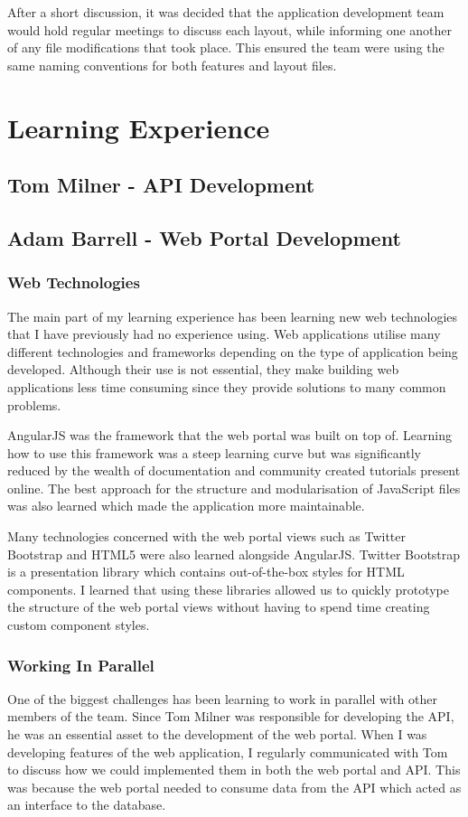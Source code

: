 \documentclass[11pt,a4paper]{report}
\begin{document}
After a short discussion, it was decided that the application development team would hold regular meetings to discuss each layout, while informing one another of any file modifications that took place. This ensured the team were using the same naming conventions for both features and layout files.

\section{Learning Experience}
\label{sec:learning-experience}
\subsection{Tom Milner - API Development}
\subsection{Adam Barrell - Web Portal Development}

\subsubsection{Web Technologies}
The main part of my learning experience has been learning new web technologies that I have previously had no experience using. Web applications utilise many different technologies and frameworks depending on the type of application being developed. Although their use is not essential, they make building web applications less time consuming since they provide solutions to many common problems.

AngularJS was the framework that the web portal was built on top of. Learning how to use this framework was a steep learning curve but was significantly reduced by the wealth of documentation and community created tutorials present online. The best approach for the structure and modularisation of JavaScript files was also learned which made the application more maintainable. 

Many technologies concerned with the web portal views such as Twitter Bootstrap and HTML5 were also learned alongside AngularJS. Twitter Bootstrap is a presentation library which contains out-of-the-box styles for HTML components. I learned that using these libraries allowed us to quickly prototype the structure of the web portal views without having to spend time creating custom component styles.

\subsubsection{Working In Parallel}
One of the biggest challenges has been learning to work in parallel with other members of the team. Since Tom Milner was responsible for developing the API, he was an essential asset to the development of the web portal. When I was developing features of the web application, I regularly communicated with Tom to discuss how we could implemented them in both the web portal and API. This was because the web portal needed to consume data from the API which acted as an interface to the database.
\end{document}
